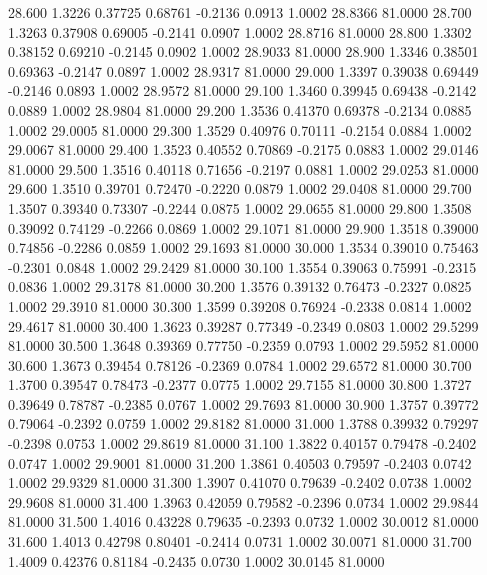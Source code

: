   28.600   1.3226   0.37725   0.68761  -0.2136   0.0913   1.0002  28.8366  81.0000
  28.700   1.3263   0.37908   0.69005  -0.2141   0.0907   1.0002  28.8716  81.0000
  28.800   1.3302   0.38152   0.69210  -0.2145   0.0902   1.0002  28.9033  81.0000
  28.900   1.3346   0.38501   0.69363  -0.2147   0.0897   1.0002  28.9317  81.0000
  29.000   1.3397   0.39038   0.69449  -0.2146   0.0893   1.0002  28.9572  81.0000
  29.100   1.3460   0.39945   0.69438  -0.2142   0.0889   1.0002  28.9804  81.0000
  29.200   1.3536   0.41370   0.69378  -0.2134   0.0885   1.0002  29.0005  81.0000
  29.300   1.3529   0.40976   0.70111  -0.2154   0.0884   1.0002  29.0067  81.0000
  29.400   1.3523   0.40552   0.70869  -0.2175   0.0883   1.0002  29.0146  81.0000
  29.500   1.3516   0.40118   0.71656  -0.2197   0.0881   1.0002  29.0253  81.0000
  29.600   1.3510   0.39701   0.72470  -0.2220   0.0879   1.0002  29.0408  81.0000
  29.700   1.3507   0.39340   0.73307  -0.2244   0.0875   1.0002  29.0655  81.0000
  29.800   1.3508   0.39092   0.74129  -0.2266   0.0869   1.0002  29.1071  81.0000
  29.900   1.3518   0.39000   0.74856  -0.2286   0.0859   1.0002  29.1693  81.0000
  30.000   1.3534   0.39010   0.75463  -0.2301   0.0848   1.0002  29.2429  81.0000
  30.100   1.3554   0.39063   0.75991  -0.2315   0.0836   1.0002  29.3178  81.0000
  30.200   1.3576   0.39132   0.76473  -0.2327   0.0825   1.0002  29.3910  81.0000
  30.300   1.3599   0.39208   0.76924  -0.2338   0.0814   1.0002  29.4617  81.0000
  30.400   1.3623   0.39287   0.77349  -0.2349   0.0803   1.0002  29.5299  81.0000
  30.500   1.3648   0.39369   0.77750  -0.2359   0.0793   1.0002  29.5952  81.0000
  30.600   1.3673   0.39454   0.78126  -0.2369   0.0784   1.0002  29.6572  81.0000
  30.700   1.3700   0.39547   0.78473  -0.2377   0.0775   1.0002  29.7155  81.0000
  30.800   1.3727   0.39649   0.78787  -0.2385   0.0767   1.0002  29.7693  81.0000
  30.900   1.3757   0.39772   0.79064  -0.2392   0.0759   1.0002  29.8182  81.0000
  31.000   1.3788   0.39932   0.79297  -0.2398   0.0753   1.0002  29.8619  81.0000
  31.100   1.3822   0.40157   0.79478  -0.2402   0.0747   1.0002  29.9001  81.0000
  31.200   1.3861   0.40503   0.79597  -0.2403   0.0742   1.0002  29.9329  81.0000
  31.300   1.3907   0.41070   0.79639  -0.2402   0.0738   1.0002  29.9608  81.0000
  31.400   1.3963   0.42059   0.79582  -0.2396   0.0734   1.0002  29.9844  81.0000
  31.500   1.4016   0.43228   0.79635  -0.2393   0.0732   1.0002  30.0012  81.0000
  31.600   1.4013   0.42798   0.80401  -0.2414   0.0731   1.0002  30.0071  81.0000
  31.700   1.4009   0.42376   0.81184  -0.2435   0.0730   1.0002  30.0145  81.0000
